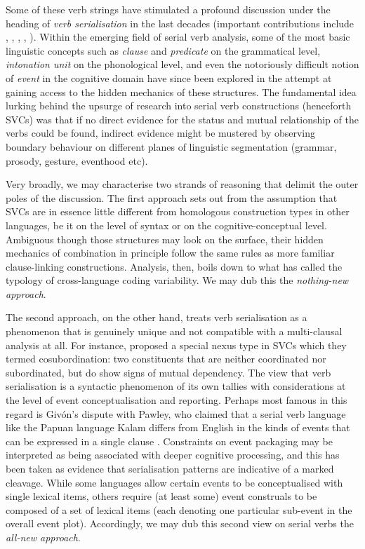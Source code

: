 Some of these verb strings have stimulated a profound discussion under the heading of \emph{verb serialisation} in the last decades (important contributions include \citealt{sebba1987syntax}, \citealt{Durie1997}, \citealt{Aikhenvald2006}, \citealt{foley2010events}, \citealt{haspelmath2016serial}). Within the emerging field of serial verb analysis, some of the most basic linguistic concepts such as \emph{clause} and \emph{predicate} on the grammatical level, \emph{intonation unit} on the phonological level, and even the notoriously difficult notion of \emph{event} in the cognitive domain have since been explored in the attempt at gaining access to the hidden mechanics of these structures. The fundamental idea lurking behind the upsurge of research into serial verb constructions (henceforth SVCs) was that if no direct evidence for the status and mutual relationship of the verbs could be found, indirect evidence might be mustered by observing boundary behaviour on different planes of linguistic segmentation (grammar, prosody, gesture, eventhood etc). 

Very broadly, we may characterise two strands of reasoning that delimit the outer poles of the discussion. The first approach sets out from the assumption that SVCs are in essence little different from homologous construction types in other languages, be it on the level of syntax or on the cognitive-conceptual level. Ambiguous though those structures may look on the surface, their hidden mechanics of combination in principle follow the same rules as more familiar clause-linking constructions. Analysis, then, boils down to what \citet{givon1991serial} has called the typology of cross-language coding variability. We may dub this the \textit{nothing-new approach}. 

The second approach, on the other hand, treats verb serialisation as a phenomenon that is genuinely unique and not compatible with a multi-clausal analysis at all. For instance, \citet{foley1984functional} proposed a special nexus type in SVCs which they termed cosubordination: two constituents that are neither coordinated nor subordinated, but do show signs of mutual dependency. The view that verb serialisation is a syntactic phenomenon of its own tallies with considerations at the level of event conceptualisation and reporting. Perhaps most famous in this regard is Givón's dispute with Pawley, who claimed that a serial verb language like the Papuan language Kalam differs from English in the kinds of events that can be expressed in a single clause \citep{Pawley1987, pawley2011event}. Constraints on event packaging may be interpreted as being associated with deeper cognitive processing, and this has been taken as evidence that serialisation patterns are indicative of a marked cleavage. While some languages  allow certain events to be conceptualised with single lexical items, others require (at least some) event construals to be composed of a set of lexical items (each denoting one particular sub-event in the overall event plot). Accordingly, we may dub this second view on serial verbs the \textit{all-new approach}.

